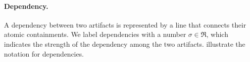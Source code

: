 




\paragraph{Dependency.}
A dependency between two artifacts is represented by a line that connects their atomic containments. We label dependencies with a number  $\sigma \in \Re$, which indicates the strength of the dependency among the two artifacts.  illustrate the notation for dependencies.


